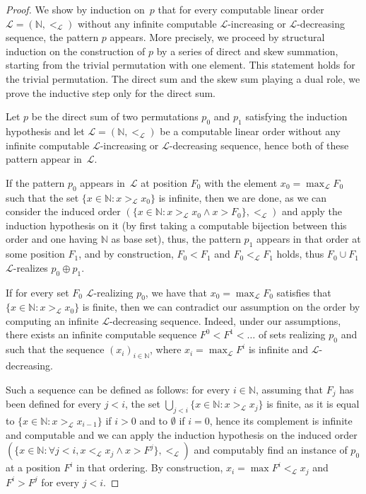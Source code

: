 \documentclass{article}
\numberwithin{theorem}{section}
\def\L{\mathcal{L}}
\newcommand{\NN}[0]{\mathbb{N}}
\begin{document}
\begin{proof}
We show by induction on~$p$ that for every computable linear order $\L = (\NN, <_\L)$ without any infinite computable $\L$-increasing or $\L$-decreasing sequence, the pattern $p$ appears.
More precisely, we proceed by structural induction on the construction of $p$ by a series of direct and skew summation, starting from the trivial permutation with one element.
This statement holds for the trivial permutation. The direct sum and the skew sum playing a dual role, we prove the inductive step only for the direct sum.

Let $p$ be the direct sum of two permutations $p_0$ and $p_1$ satisfying the induction hypothesis and let $\L = (\NN,<_\L)$ be a computable linear order without any infinite computable $\L$-increasing or $\L$-decreasing sequence, hence both of these pattern appear in~$\L$.

If the pattern $p_0$ appears in~$\L$ at position $F_0$ with the element $x_0 = \max_\L F_0$ such that the set $\{x \in \NN : x >_\L x_0\}$ is infinite, then we are done, as we can consider the induced order $(\{x \in \NN : x >_\L x_0 \wedge x > F_0\}, <_\L)$ and apply the induction hypothesis on it (by first taking a computable bijection between this order and one having $\NN$ as base set), thus, the pattern $p_1$ appears in that order at some position $F_1$, and by construction, $F_0 < F_1$ and $F_0 <_\L F_1$ holds, thus $F_0 \cup F_1$ $\L$-realizes $p_0 \oplus p_1$.

If for every set $F_0$ $\L$-realizing $p_0$, we have that $x_0 = \max_\L F_0$ satisfies that $\{x \in \NN : x >_{\L} x_0\}$ is finite, then we can contradict our assumption on the order by computing an infinite $\L$-decreasing sequence. Indeed, under our assumptions, there exists an infinite computable sequence $F^0 < F^1 < \dots$ of sets realizing $p_0$ and such that the sequence $(x_i)_{i \in \NN}$, where $x_i = \max_{\L} F^i$ is infinite and $\L$-decreasing. 

Such a sequence can be defined as follows: for every $i \in \NN$, assuming that $F_j$ has been defined for every $j < i$, the set $\bigcup_{j < i} \{x \in \NN : x >_{\L} x_j\}$ is finite, as it is equal to $\{x \in \NN : x >_{\L} x_{i-1}\}$ if $i > 0$ and to $\emptyset$ if $i = 0$, hence its complement is infinite and computable and we can apply the induction hypothesis on the induced order $(\{x \in \NN : \forall j < i, x <_{\L} x_j \wedge x > F^j\}, <_{\L})$ and computably find an instance of $p_0$ at a position $F^i$ in that ordering. By construction, $x_i = \max F^i <_\L x_j$ and $F^i > F^j$ for every $j < i$.


\end{proof}
\end{document}
